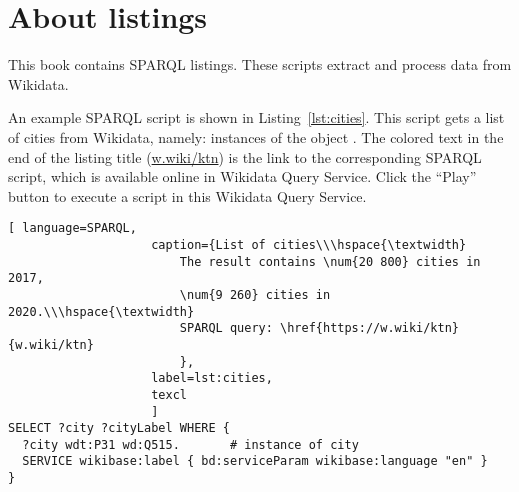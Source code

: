 
\section{About listings}

This book contains SPARQL listings.
These scripts extract and process data from Wikidata.%

An example SPARQL script is shown in Listing~\ref{lst:cities}. 
This script gets a list of cities from Wikidata, 
namely: instances of the object .
The colored text in the end of the listing title 
(\href{https://w.wiki/ktn}{w.wiki/ktn}) 
is the link to the corresponding SPARQL script,  
which is available online in Wikidata Query Service. 
Click the ``Play'' button to execute a script in this Wikidata Query Service. 

\begin{lstlisting}[ language=SPARQL, 
                    caption={List of cities\\\hspace{\textwidth}
                        The result contains \num{20 800} cities in 2017, 
                        \num{9 260} cities in 2020.\\\hspace{\textwidth}
                        SPARQL query: \href{https://w.wiki/ktn}{w.wiki/ktn}
                        },
                    label=lst:cities,
                    texcl 
                    ]
SELECT ?city ?cityLabel WHERE { 
  ?city wdt:P31 wd:Q515.       # instance of city 
  SERVICE wikibase:label { bd:serviceParam wikibase:language "en" }
}
\end{lstlisting}%



